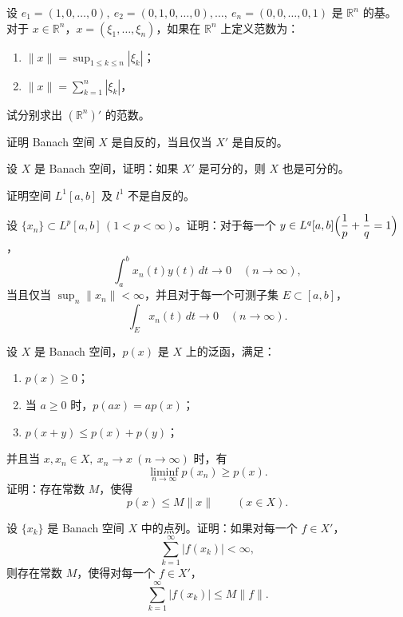 \begin{homework}[3.2]
设 $e_1=(1,0,\dots,0),\ e_2=(0,1,0,\dots,0),\dots,\ e_n=(0,0,\dots,0,1)$ 是 $\mathbb{R}^n$ 的基。
对于 $x\in\mathbb{R}^n$，$x=(\xi_1,\dots,\xi_n)$，如果在 $\mathbb{R}^n$ 上定义范数为：

\begin{enumerate}
  \item $\displaystyle \|x\|=\sup_{1\le k\le n}|\xi_k|$；
  \item $\displaystyle \|x\|=\sum_{k=1}^n |\xi_k|$，
\end{enumerate}

试分别求出 $(\mathbb{R}^n)'$ 的范数。
\end{homework}

\begin{homework}[3.3]
证明 Banach 空间 $X$ 是自反的，当且仅当 $X'$ 是自反的。
\end{homework}

\begin{homework}[3.4]
设 $X$ 是 Banach 空间，证明：如果 $X'$ 是可分的，则 $X$ 也是可分的。
\end{homework}

\begin{homework}[3.5]
证明空间 $L^{1}[a,b]$ 及 $l^{1}$ 不是自反的。
\end{homework}
\begin{homework}[3.6]
设 $\{x_n\}\subset L^{p}[a,b]\,(1<p<\infty)$。证明：对于每一个 $y\in L^{q}[a,b]\Bigl(\dfrac{1}{p}+\dfrac{1}{q}=1\Bigr)$，
\[
\int_a^b x_n(t)y(t)\,dt \longrightarrow 0\quad(n\to\infty),
\]
当且仅当 $\sup_n \|x_n\|<\infty$，并且对于每一个可测子集 $E\subset[a,b]$，
\[
\int_E x_n(t)\,dt \longrightarrow 0\quad(n\to\infty).
\]
\end{homework}

\begin{homework}[3.7]
设 $X$ 是 Banach 空间，$p(x)$ 是 $X$ 上的泛函，满足：
\begin{enumerate}
  \item $p(x)\ge0$；
  \item 当 $a\ge0$ 时，$p(ax)=ap(x)$；
  \item $p(x+y)\le p(x)+p(y)$；
\end{enumerate}
并且当 $x,x_n\in X,\ x_n\to x\ (n\to\infty)$ 时，有
\[
\liminf_{n\to\infty} p(x_n) \ge p(x).
\]
证明：存在常数 $M$，使得
\[
p(x)\le M\|x\|\qquad (x\in X).
\]
\end{homework}

\begin{homework}[3.8]
设 $\{x_k\}$ 是 Banach 空间 $X$ 中的点列。证明：如果对每一个 $f\in X'$，
\[
\sum_{k=1}^{\infty}|f(x_k)|<\infty,
\]
则存在常数 $M$，使得对每一个 $f\in X'$，
\[
\sum_{k=1}^{\infty}|f(x_k)|\le M\|f\|.
\]
\end{homework}

